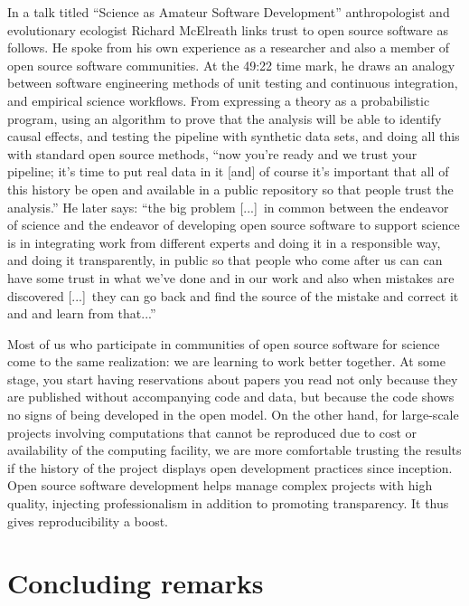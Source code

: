 \documentclass{statement}
\newlength{\up}
\begin{document}
In a talk titled ``Science as Amateur Software Development'' \citep{mcelreath2020} anthropologist and evolutionary ecologist Richard McElreath links trust to open source software as follows.
He spoke from his own experience as a researcher and also a member of open source software communities.
At the 49:22 time mark,  he draws an analogy between software engineering methods of unit testing and continuous integration, and empirical science workflows. 
From expressing a theory as a probabilistic program, using an algorithm to prove that the analysis will be able to identify causal effects, and testing the pipeline with synthetic data sets, and doing all this with standard open source methods, ``now you’re ready and we trust your pipeline; it’s time to put real data in it [and] of course it’s important that all of this history be open and available in a public repository so that people trust the analysis.''
He later says:  ``the big problem [...]\ in common between the endeavor of science and the endeavor of developing open source software to support science is in integrating work from different experts and doing it in a responsible way, and doing it transparently, in public so that people who come after us can can have some trust in what we've done and in our work and also when mistakes are discovered [...]\ they can go back and find the source of the mistake and correct it and and learn from that...''

Most of us who participate in communities of open source software for science come to the same realization: we are learning to work better together. 
At some stage, you start having reservations about papers you read not only because they are published without accompanying code and data, but because the code shows no signs of being developed in the open model. 
On the other hand, for large-scale projects involving computations that cannot be reproduced due to cost or availability of the computing facility, we are more comfortable trusting the results if the history of the project displays open development practices since inception.
Open source software development helps manage complex projects with high quality, injecting professionalism in addition to promoting transparency. 
It thus gives reproducibility a boost.


\section*{Concluding remarks}
\vspace{\up}
\end{document}

